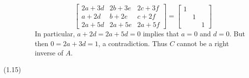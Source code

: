 \begin{description}
\begin{itemize}
$$\begin{bmatrix}
2a + 3d & 2b + 3e & 2c + 3f \\
a + 2d & b + 2e & c + 2f \\
2a + 5d & 2a + 5e & 2a + 5f
\end{bmatrix} = \begin{bmatrix}
1 & & \\
& 1 & \\
& & 1
\end{bmatrix} $$
In particular, $a + 2d = 2a + 5d = 0$ implies that $a = 0$ and $d = 0$. But then $0 = 2a + 3d = 1$, a contradiction. Thus $C$ cannot be a right inverse of $A$.
\end{itemize}
\item[(1.15)]
\end{description}